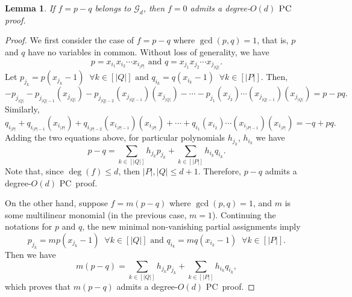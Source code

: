 \documentclass[11pt]{article}
\newcommand{\nota}[1]{ {\tiny \marginnote{#1}[0cm]}}
\newcommand{\Cc}{\mathcal{C}}
\newcommand{\PC}{\textsc{PC}}
\newcommand{\I}{\emph{$\rm{I}$}}
\newcommand{\1}{\textbf{1}}
\newtheorem{lemma}[theorem]{Lemma}
\begin{document}
\begin{lemma}\label{th:f_sos}
If $f=p-q$ belongs to $\mathcal{G}_d$, then $f=0$ admits a degree-$O(d)$ $\PC$ proof.
\end{lemma}
\begin{proof}
    We first consider the case of $f=p-q$ where $\gcd(p,q)=1$, that is, $p$ and $q$ have no variables in common. Without loss of generality, we have
\begin{equation*}
    p = x_{i_1}x_{i_2}\cdots x_{i_{|P|}} \textrm{ and } q = x_{j_1}x_{j_2}\cdots x_{j_{|Q|}}.
\end{equation*}
Let 
$p_{j_k} = p(x_{j_k}-1) \;\;\forall k\in [|Q|] \textrm{ and } q_{i_k} = q(x_{i_k}-1) \;\;\forall k\in [|P|].$
Then,
\begin{equation*}
    - p_{j_{|Q|}} - p_{j_{|Q|-1}}(x_{j_{|Q|}}) - p_{j_{|Q|-2}}(x_{j_{|Q|-1}})(x_{j_{|Q|}}) - \cdots - p_{j_{1}}(x_{j_2})\cdots(x_{j_{|Q|-1}})(x_{j_{|Q|}}) = p - pq.
\end{equation*}
Similarly, 
\begin{equation*}
    q_{i_{|P|}} + q_{i_{|P|-1}}(x_{i_{|P|}}) + q_{i_{|P|-2}}(x_{i_{|P|-1}})(x_{i_{|P|}}) + \cdots + q_{i_{1}}(x_{i_2})\cdots(x_{i_{|P|-1}})(x_{i_{|P|}}) = -q + pq.
\end{equation*}
Adding the two equations above, for particular polynomials $h_{j_k}$, $h_{i_k}$  we have
\begin{equation*}
    p - q = \sum_{k\in [|Q|]} h_{j_{k}}p_{j_{k}} + \sum_{k \in [|P|]} h_{i_{k}}q_{i_{k}}.
\end{equation*}
Note that, since $\deg(f) \leq d$, then $|P|,|Q| \leq d+1$. Therefore, $p-q$ admits a degree-$O(d)$ \PC\ proof.

On the other hand, suppose $f=m(p-q)$ where $\gcd(p,q)=1$, and $m$ is some multilinear monomial (in the previous case, $m=1$). Continuing the notations for $p$ and $q$, the new minimal non-vanishing partial assignments imply
\begin{equation*}
    p_{j_k} = mp(x_{j_k}-1) \;\;\forall k\in [|Q|] \textrm{ and } q_{i_k} = mq(x_{i_k}-1) \;\;\forall k\in [|P|].
\end{equation*}
Then we have
\begin{equation*}
    m(p - q) = \sum_{k\in [|Q|]} h_{j_{k}}p_{j_{k}} + \sum_{k \in [|P|]} h_{i_{k}}q_{i_{k}},
\end{equation*}
which proves that $m(p-q)$ admits a degree-$O(d)$ \PC\ proof.
\end{proof}
\end{document}
